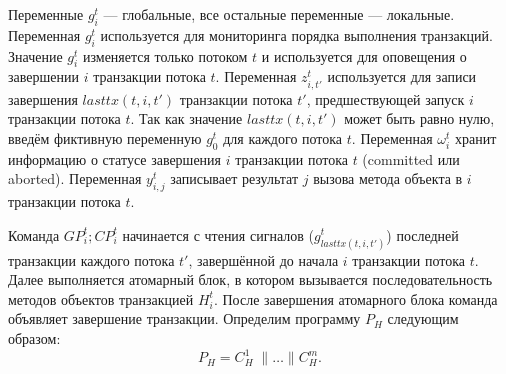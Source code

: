 \begin{myproof}
Переменные $g^t_i$ --- глобальные, все остальные переменные --- локальные. Переменная $g^t_i$ используется для мониторинга порядка выполнения транзакций. Значение $g^t_i$ изменяется только потоком $t$ и используется для оповещения о завершении $i$ транзакции потока $t$. Переменная $z^t_{i,t'}$ используется для записи завершения $lasttx(t, i, t')$ транзакции потока $t'$, предшествующей запуск $i$ транзакции потока $t$. Так как значение $lasttx(t, i, t')$ может быть равно нулю, введём фиктивную переменную $g^t_0$ для каждого потока $t$. Переменная $\omega^t_i$ хранит информацию о статусе завершения $i$ транзакции потока $t$ (committed или aborted). Переменная $y^t_{i,j}$ записывает результат $j$ вызова метода объекта в $i$ транзакции потока $t$. 

Команда $GP^t_i;CP^t_i$ начинается с чтения сигналов ($g^t_{lasttx(t,i,t')}$) последней транзакции каждого потока $t'$, завершённой до начала $i$ транзакции потока $t$. Далее выполняется атомарный блок, в котором вызывается последовательность методов объектов транзакцией $H^t_i$. После завершения атомарного блока команда объявляет завершение транзакции. Определим программу $P_H$ следующим образом: $$P_H = C^1_H \; \parallel \ldots \parallel C^m_H.$$


\end{myproof}
